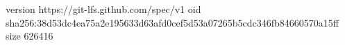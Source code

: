 version https://git-lfs.github.com/spec/v1
oid sha256:38d53dc4ea75a2e195633d63afd0cef5d53a07265b5cdc346fb84660570a15ff
size 626416
